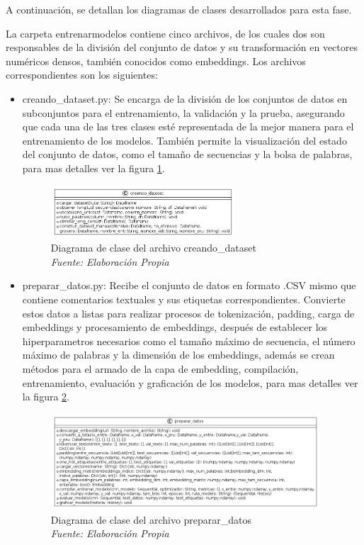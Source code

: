 A continuación, se detallan los diagramas de clases desarrollados para esta fase.

 La carpeta entrenarmodelos contiene cinco archivos, de los cuales dos son responsables de la división del conjunto de datos y su transformación en vectores numéricos densos, también conocidos como embeddings. Los archivos correspondientes son los siguientes: 

\begin{itemize}

\item creando\_dataset.py: Se encarga de la división de los conjuntos de datos en subconjuntos para el entrenamiento, la validación y la prueba, asegurando que cada una de las tres clases esté representada de la mejor manera para el entrenamiento de los modelos. También permite la visualización del estado del conjunto de datos, como el tamaño de secuencias y la bolsa de palabras, para mas detalles ver la figura \ref{fig:uml7}.

\begin{figure}
	\includegraphics[width=0.65\textwidth]{capitulo5/figuras/fig7.png}
	\caption[Diagrama de clase del archivo creando\_dataset]{Diagrama de clase del archivo creando\_dataset
		\\\textit{Fuente: Elaboración Propia}}
	\label{fig:uml7}
\end{figure}

\item preparar\_datos.py: Recibe el conjunto de datos en formato .CSV mismo que contiene comentarios textuales y sus etiquetas correspondientes. Convierte estos datos a listas para realizar procesos de tokenización, padding, carga de embeddings y procesamiento de embeddings, después de establecer los hiperparametros necesarios como el tamaño máximo de secuencia, el número máximo de palabras y la dimensión de los embeddings, además se crean métodos para el armado de la capa de embedding, compilación, entrenamiento, evaluación y graficación de los modelos, para mas detalles ver la figura \ref{fig:uml8}.

\begin{figure}[h!]
	\includegraphics[width=0.95\textwidth]{capitulo5/figuras/fig8.png}
	\caption[Diagrama de clase del archivo preparar\_datos]{Diagrama de clase del archivo preparar\_datos
		\\\textit{Fuente: Elaboración Propia}}
	\label{fig:uml8}
\end{figure}


\end{itemize}
